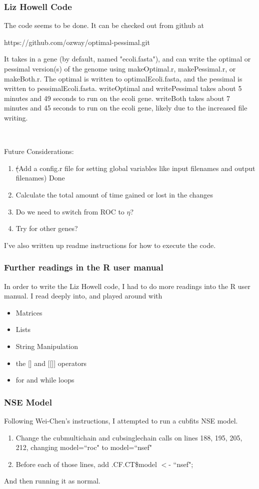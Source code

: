 \documentclass[11pt]{article} %
\begin{document}
\subsubsection{Liz Howell Code}
The code seems to be done. It can be checked out from github at

https://github.com/ozway/optimal-pessimal.git

It takes in a gene (by default, named "ecoli.fasta"), and can write the optimal or pessimal version(s) of the genome using makeOptimal.r, makePessimal.r, or makeBoth.r. The optimal is written to optimalEcoli.fasta, and the pessimal is written to pessimalEcoli.fasta. writeOptimal and writePessimal takes about 5 minutes and 49 seconds to run on the ecoli gene. writeBoth takes about 7 minutes and 45 seconds to run on the ecoli gene, likely due to the increased file writing.

~

\noindent Future Considerations:
\begin{enumerate}
\item \sout(Add a config.r file for setting global variables like input filenames and output filenames) Done
\item Calculate the total amount of time gained or lost in the changes
\item Do we need to switch from ROC to $\eta$?
\item Try for other genes?
\end{enumerate}

I've also written up readme instructions for how to execute the code.


\subsubsection{Further readings in the R user manual}
In order to write the Liz Howell code, I had to do more readings into the R user manual. I read deeply into, and played around with
\begin{itemize}
\item Matrices
\item Lists
\item String Manipulation
\item the [] and [[]] operators
\item for and while loops
\end{itemize}

\subsubsection{NSE Model}
Following Wei-Chen's instructions, I attempted to run a cubfits NSE model.
\begin{enumerate}
\item Change the cubmultichain and cubsinglechain calls on lines 188, 195, 205, 212, changing model=``roc" to model=``nsef"
\item Before each of those lines, add .CF.CT\$model $<$- ``nsef";
\end{enumerate}
And then running it as normal.
\end{document}
